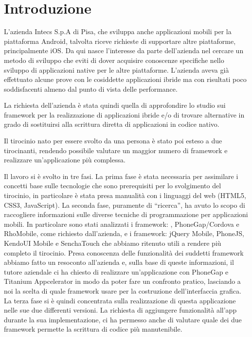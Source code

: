 \setcounter{page}{1}

\chapter{Introduzione}
    L'azienda Intecs S.p.A di Pisa, che sviluppa anche applicazioni mobili per la
    piattaforma Android, talvolta riceve richieste di supportare altre piattaforme,
    principalmente iOS. Da qui nasce l'interesse da parte dell'azienda nel
    cercare un metodo di sviluppo \crossplat{} che eviti di dover acquisire
    conoscenze specifiche nello sviluppo di applicazioni native per le altre
    piattaforme. L'azienda aveva già effettuato alcune prove con le cosiddette
    applicazioni ibride ma con risultati poco soddisfacenti almeno dal punto di
    vista delle performance.

    La richiesta dell'azienda è stata quindi quella di approfondire lo studio sui
    framework per la realizzazione di applicazioni ibride e/o di trovare alternative
    in grado di sostituirsi alla scrittura diretta di applicazioni in codice
    nativo.

    Il tirocinio nato per essere svolto da una persona è stato poi esteso a due
    tirocinanti, rendendo possibile valutare un maggior numero di framework e
    realizzare un'applicazione più complessa.

    Il lavoro si è svolto in tre fasi. La prima fase è stata necessaria per
    assimilare i concetti base sulle tecnologie che sono prerequisiti per lo
    svolgimento del tirocinio, in particolare è stata presa manualità con i
    linguaggi del web (HTML5, CSS3, JavaScript). La seconda fase, puramente di
    ``ricerca'', ha avuto lo scopo di raccogliere informazioni sulle diverse
    tecniche di programmazione per applicazioni mobili. In particolare sono
    stati analizzati i framework: \tisdk{},
    PhoneGap/Cordova e RhoMobile, come richiesto dall'azienda, e i framework:
    jQuery Mobile, PhoneJS, KendoUI Mobile e SenchaTouch che abbiamo ritenuto
    utili a rendere più completo il tirocinio.
    Presa conoscenza delle funzionalità dei suddetti framework abbiamo fatto un
    resoconto all'azienda e, sulla base di queste informazioni, il tutore
    aziendale ci ha chiesto di realizzare un'applicazione con PhoneGap e Titanium
    Appcelerator in modo da poter fare un confronto pratico, lasciando a noi la
    scelta di quale framework usare per la costruzione dell'interfaccia grafica.
    La terza fase si è quindi concentrata sulla realizzazione di questa
    applicazione nelle sue due differenti versioni. La richiesta di aggiungere
    funzionalità all'app durante la sua implementazione, ci ha permesso anche di
    valutare quale dei due framework permette la scrittura di codice più
    manutenibile.

